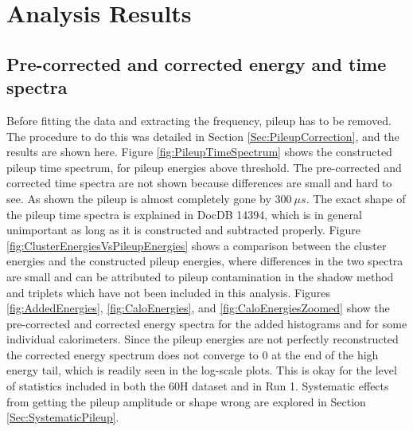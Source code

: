 \graphicspath{ {Figures/Pileup/Energies/} {Figures/Pileup/TimeSpectra/} {Figures/Main/} {Figures/ResidualsFFT/} {Figures/FitStartScans/} {Figures/PerCalo/} }

\chapter{Analysis Results}
\label{Ch:Results}

\section{Pre-corrected and corrected energy and time spectra}

	Before fitting the data and extracting the \gmtwo frequency, pileup has to be removed. The procedure to do this was detailed in Section \ref{Sec:PileupCorrection}, and the results are shown here. Figure \ref{fig:PileupTimeSpectrum} shows the constructed pileup time spectrum, for pileup energies above threshold. The pre-corrected and corrected time spectra are not shown because differences are small and hard to see. As shown the pileup is almost completely gone by $\SI{300}{\mu s}$. The exact shape of the pileup time spectra is explained in DocDB 14394, which is in general unimportant as long as it is constructed and subtracted properly. Figure \ref{fig:ClusterEnergiesVsPileupEnergies} shows a comparison between the cluster energies and the constructed pileup energies, where differences in the two spectra are small and can be attributed to pileup contamination in the shadow method and triplets which have not been included in this analysis. Figures \ref{fig:AddedEnergies}, \ref{fig:CaloEnergies}, and \ref{fig:CaloEnergiesZoomed} show the pre-corrected and corrected energy spectra for the added histograms and for some individual calorimeters. Since the pileup energies are not perfectly reconstructed the corrected energy spectrum does not converge to 0 at the end of the high energy tail, which is readily seen in the log-scale plots. This is okay for the level of statistics included in both the 60H dataset and in Run 1. Systematic effects from getting the pileup amplitude or shape wrong are explored in Section \ref{Sec:SystematicPileup}.


